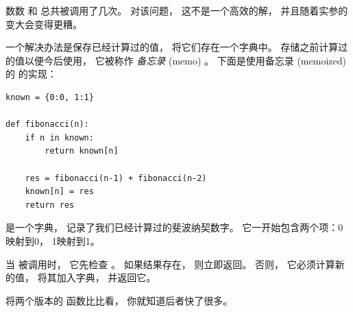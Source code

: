   


数数  和  总共被调用了几次。
对该问题， 这不是一个高效的解， 并且随着实参的变大会变得更糟。



一个解决办法是保存已经计算过的值， 将它们存在一个字典中。
存储之前计算过的值以便今后使用， 它被称作 {\em 备忘录} (memo) 。
下面是使用备忘录 (memoized) 的  的实现：

\begin{lstlisting}
known = {0:0, 1:1}

def fibonacci(n):
    if n in known:
        return known[n]

    res = fibonacci(n-1) + fibonacci(n-2)
    known[n] = res
    return res
\end{lstlisting}

%

 是一个字典， 记录了我们已经计算过的斐波纳契数字。
它一开始包含两个项：0映射到0， 1映射到1。


当  被调用时， 它先检查  。   如果结果存在， 则立即返回。   否则， 它必须计算新的值， 将其加入字典， 并返回它。


将两个版本的  函数比比看， 你就知道后者快了很多。


